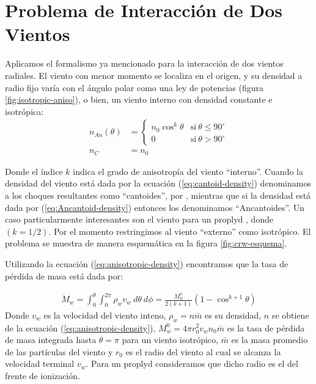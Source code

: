 \section{Problema de Interacción de Dos Vientos}
\label{sec:CRW-2-winds}
Aplicamos el formalismo ya mencionado para la interacción de dos vientos radiales. El viento con menor momento se localiza en el origen, y su densidad a radio fijo varía con el ángulo polar como una ley de potencias (figura \ref{fig:isotropic-aniso}), o bien, un viento interno con densidad constante e isotrópica:
\begin{align}
  n_{An}(\theta) &=\left\lbrace
  \begin{array}{lr}
    n_0\cos^k\theta \label{eq:anisotropic-density} & \mathrm{si~}\theta\leq 90^\circ \\
    0 & \mathrm{si~}\theta > 90^\circ
  \end{array}\right. \label{eq:Ancantoid-density}\\
  n_C &= n_0 \label{eq:cantoid-density}
\end{align}

Donde el índice $k$ indica el grado de anisotropía del viento ``interno''. Cuando la densidad del viento está dada por la ecuación (\ref{eq:cantoid-density}) denominamos a los choques resultantes como ``cantoides'', por \citet{Canto:1996}, mientras que si la densidad está dada por (\ref{eq:Ancantoid-density}) entonces los denominamos ``Ancantoides''. Un caso particularmente interesantes son el viento para un proplyd \citep{HA:1998}, donde $(k=1/2)$. Por el momento restringimos al viento ``externo'' como isotrópico. El problema se muestra de manera esquemática en la figura \ref{fig:crw-esquema}.

Utilizando la ecuación (\ref{eq:anisotropic-density}) encontramos que la tasa de pérdida de masa está dada por:

\begin{align}
  \dot{M}_w = \int^\theta_0\int^{2\pi}_0\rho_w v_w~d\theta~d\phi =
  \frac{M^0_w}{2\left(k+1\right)}\left(1 - \cos^{k+1}\theta\right) \label{eq:inner-dot-M}
\end{align}
Donde $v_w$ es la velocidad del viento inteno, $\rho_w = n\bar{m}$  es su densidad, $n$ se obtiene de la ecuación (\ref{eq:anisotropic-density}), $M^0_w = 4\pi r^2_0v_w n_0 \bar{m}$ es la tasa de pérdida de masa integrada hasta
$\theta = \pi$ para un viento isotrópico, $\bar{m}$  es la masa promedio de las partículas del viento y $r_0$ es el radio del viento al cual se alcanza la velocidad terminal $v_w$. Para un proplyd consideramos que dicho
radio es el del frente de ionización.

